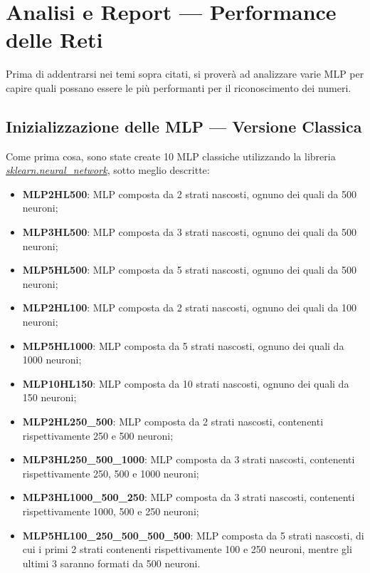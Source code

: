 \documentclass[12pt, a4paper]{article}
\begin{document}
\newpage
\section{Analisi e Report --- Performance delle Reti}
Prima di addentrarsi nei temi sopra citati, si proverà ad analizzare varie MLP per capire quali possano essere le più performanti per il riconoscimento dei numeri.\\
\subsection{Inizializzazione delle MLP --- Versione Classica}
Come prima cosa, sono state create 10 MLP classiche utilizzando la libreria \href{https://scikit-learn.org/stable/modules/generated/sklearn.neural_network.MLPClassifier.html#sklearn.neural_network.MLPClassifier}{\textit{sklearn.neural\_network}}, sotto meglio descritte:
\begin{itemize}
    \item \textbf{MLP2HL500}: MLP composta da 2 strati nascosti, ognuno dei quali da 500 neuroni;
    \item \textbf{MLP3HL500}: MLP composta da 3 strati nascosti, ognuno dei quali da 500 neuroni;
    \item \textbf{MLP5HL500}: MLP composta da 5 strati nascosti, ognuno dei quali da 500 neuroni;
    \item \textbf{MLP2HL100}: MLP composta da 2 strati nascosti, ognuno dei quali da 100 neuroni;
    \item \textbf{MLP5HL1000}: MLP composta da 5 strati nascosti, ognuno dei quali da 1000 neuroni;
    \item \textbf{MLP10HL150}: MLP composta da 10 strati nascosti, ognuno dei quali da 150 neuroni; 
    \item \textbf{MLP2HL250\_500}: MLP composta da 2 strati nascosti, contenenti rispettivamente 250 e 500 neuroni; 
    \item \textbf{MLP3HL250\_500\_1000}: MLP composta da 3 strati nascosti, contenenti rispettivamente 250, 500 e 1000 neuroni; 
    \item \textbf{MLP3HL1000\_500\_250}: MLP composta da 3 strati nascosti, contenenti rispettivamente 1000, 500 e 250 neuroni; 
    \item \textbf{MLP5HL100\_250\_500\_500\_500}: MLP composta da 5 strati nascosti, di cui i primi 2 strati contenenti rispettivamente 100 e 250 neuroni, mentre gli ultimi 3 saranno formati da 500 neuroni.
\end{itemize}
\end{document}
